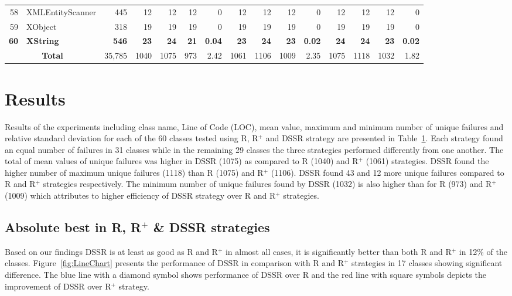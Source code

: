 \begin{table} [htp!]
{\begin{tabularx}{1 \textwidth}{r l r r r r r r r r r r r r r}
58						& XMLEntityScanner			&445		& 12		&	12	&	12	& 	0					& 12		&  12		& 12		& 		0			& 12			& 12			& 12			&	0\\      
59						& XObject					&318		& 19		&	19	&	19	& 	0					& 19		&  19		& 19		& 		0			& 19			& 19			& 19			&	0\\      
\textbf{60}						& \textbf{XString}					&\textbf{546}		& \textbf{23}		&	\textbf{24}	&	\textbf{21}	& 	\textbf{0.04}					& \textbf{23}		&  \textbf{24}		& \textbf{23}		& 		\textbf{0.02}			& \textbf{24}			& \textbf{24}			& \textbf{23}			&	\textbf{0.02}\\      

    						\multicolumn{2}{c}{\textbf{Total}}	&35,785	&1040	&	1075	&    973	&	2.42				& 1061	&1106	&1009	&		2.35		& 1075		& 1118		& 1032		& 	1.82\\
     \end{tabularx} }
    \bigskip
    \label{table:Results}
\end{table}

\section{Results}\label{sec:res}
Results of the experiments including class name, Line of Code (LOC), mean value, maximum and minimum number of unique failures and relative standard deviation for each of the 60 classes tested using R, R$^+$ and DSSR strategy are presented in Table~\ref{table:Results}. Each strategy found an equal number of failures in 31 classes while in the remaining 29 classes the three strategies performed differently from one another. The total of mean values of unique failures was higher in DSSR (1075) as compared to R (1040) and R$^+$ (1061) strategies. 
DSSR found the higher number of maximum unique failures (1118) than R (1075) and R$^+$ (1106). DSSR found 43 and 12 more unique failures compared to R and R$^+$ strategies respectively. The minimum number of unique failures found by DSSR (1032) is also higher than for R (973) and R$^+$ (1009) which attributes to higher efficiency of DSSR strategy over R and R$^+$ strategies. 


\subsection{Absolute best in R, R$^+$ \& DSSR strategies}
Based on our findings DSSR is at least as good as R and R$^+$ in almost all cases, it is significantly better than both R and R$^+$ in 12\% of the classes. Figure~\ref{fig:LineChart} presents the performance of DSSR in comparison with R and R$^+$ strategies in 17 classes showing significant difference. The blue line with a diamond symbol shows performance of DSSR over R and the red line with square symbols depicts the improvement of DSSR over R$^+$ strategy. 

